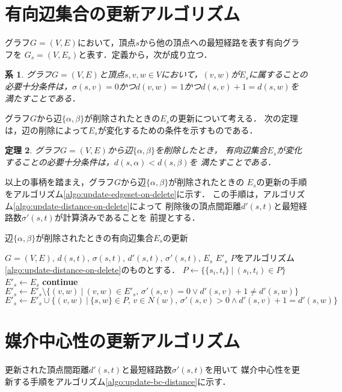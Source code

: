 \documentclass{jarticle}
\newtheorem{theorem}{定理}
\newtheorem{corollary}[theorem]{系}
\begin{document}
\section{有向辺集合の更新アルゴリズム}
グラフ$G=(V,E)$において，頂点$s$から他の頂点への最短経路を表す有向グラフを
$G_s=(V,E_s)$と表す．定義から，次が成り立つ．

\begin{corollary}
  グラフ$G=(V,E)$と頂点$s,v,w\in V$において，$(v,w)$が$E_s$に属することの
  必要十分条件は，$\sigma(s,v)=0$かつ$d(v,w)=1$かつ$d(s,v)+1=d(s,w)$を
  満たすことである．
\end{corollary}

グラフ$G$から辺$\{\alpha,\beta\}$が削除されたときの$E_s$の更新について考える．
次の定理は，辺の削除によって$E_s$が変化するための条件を示すものである．

\begin{theorem}
  グラフ$G=(V,E)$から辺$\{\alpha,\beta\}$を削除したとき，
  有向辺集合$E_s$が変化することの必要十分条件は，$d(s,\alpha)<d(s,\beta)$を
  満たすことである．
\end{theorem}

以上の事柄を踏まえ，グラフ$G$から辺$\{\alpha,\beta\}$が削除されたときの
$E_s$の更新の手順をアルゴリズム\ref{algo:update-edgeset-on-delete}に示す．
この手順は，アルゴリズム\ref{algo:update-distance-on-delete}によって
削除後の頂点間距離$d'(s,t)$と最短経路数$\sigma'(s,t)$が計算済みであることを
前提とする．

\begin{algorithm}[H]
  \caption{辺$\{\alpha,\beta\}$が削除されたときの有向辺集合$E_s$の更新}
  \label{algo:update-edgeset-on-delete}
  \begin{algorithmic}[1]
    \Require $G=(V,E),\,d(s,t),\,\sigma(s,t),\,d'(s,t),\,\sigma'(s,t),\,E_s$
    \Ensure $E'_s$
    \State $P$をアルゴリズム\ref{algo:update-distance-on-delete}のものとする．
    \State $P\gets\{\{s_i,t_i\}\:|\:(s_i,t_i)\in P\}$
    \State $E'_s\gets E_s$
    \State \textbf{continue}
    \EndIf
    \State $E'_s\gets E'_s\setminus\{(v,w)\:|\:(v,w)\in E'_s,\,\sigma'(s,v)=0\lor d'(s,v)+1\neq d'(s,w)\}$
    \State $E'_s\gets E'_s\cup\{(v,w)\:|\:\{s,w\}\in P,\,v\in N(w),\,\sigma'(s,v)>0\land d'(s,v)+1=d'(s,w)\}$
    \EndFor
  \end{algorithmic}
\end{algorithm}

\section{媒介中心性の更新アルゴリズム}
更新された頂点間距離$d'(s,t)$と最短経路数$\sigma'(s,t)$を用いて
媒介中心性を更新する手順をアルゴリズム\ref{algo:update-bc-distance}に示す．
\end{document}
